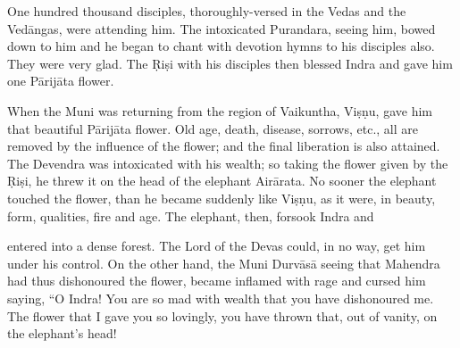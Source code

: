One hundred thousand disciples, thoroughly-versed in the Vedas and the Ved\=angas, were attending him. The intoxicated Purandara, seeing him, bowed down to him and he began to chant with devotion hymns to his disciples also. They were very glad. The \d{R}i\d{s}i with his disciples then blessed Indra and gave him one P\=arij\=ata flower.

When the Muni was returning from the region of Vaikuntha, Vi\d{s}\d{n}u, gave him that beautiful P\=arij\=ata flower. Old age, death, disease, sorrows, etc., all are removed by the influence of the flower; and the final liberation is also attained. The Devendra was intoxicated with his wealth; so taking the flower given by the \d{R}i\d{s}i, he threw it on the head of the elephant Air\=arata. No sooner the elephant touched the flower, than he became suddenly like Vi\d{s}\d{n}u, as it were, in beauty, form, qualities, fire and age. The elephant, then, forsook Indra and

entered into a dense forest. The Lord of the Devas could, in no way, get him under his control. On the other hand, the Muni Durv\=as\=a seeing that Mahendra had thus dishonoured the flower, became inflamed with rage and cursed him saying, ``O Indra! You are so mad with wealth that you have dishonoured me. The flower that I gave you so lovingly, you have thrown that, out of vanity, on the elephant's head!

